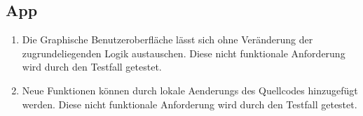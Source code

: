 \subsection*{App}

\begin{samepage}
    \begin{enumerate}[label=\textbf{/NFW\arabic*0/}, align=left]
        \item \label{/NFW10/} Die Graphische Benutzeroberfläche lässt sich ohne Veränderung der zugrundeliegenden Logik austauschen. Diese nicht funktionale Anforderung wird durch den Testfall  getestet.
        \item \label{/NFW20/} Neue Funktionen können durch \glspl{lokale Aenderung} des \Gls{Quellcode}s hinzugefügt werden. Diese nicht funktionale Anforderung wird durch den Testfall  getestet.
    \end{enumerate}
\end{samepage}